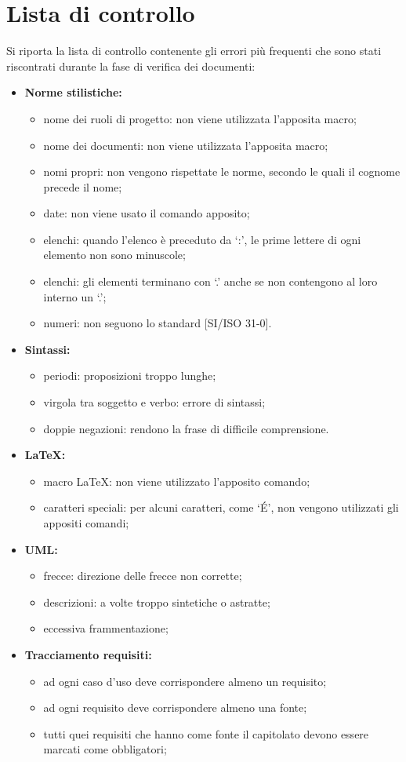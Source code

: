 \section{Lista di controllo}
Si riporta la lista di controllo contenente gli errori più frequenti che sono stati riscontrati durante la fase di verifica dei documenti:
\begin{itemize}
	\item \textbf{Norme stilistiche:}
	\begin{itemize}
		\item nome dei ruoli di progetto: non viene utilizzata l'apposita macro;
		\item nome dei documenti: non viene utilizzata l'apposita macro;
		\item nomi propri: non vengono rispettate le norme, secondo le quali il cognome precede il nome;
		\item date: non viene usato il comando apposito;
		\item elenchi: quando l'elenco è preceduto da ‘:’, le prime lettere di ogni elemento non sono minuscole;
		\item elenchi: gli elementi terminano con ‘.’ anche se non contengono al loro interno un ‘.’;
		\item numeri: non seguono lo standard [SI/ISO 31-0].
	\end{itemize}
	\item \textbf{Sintassi:}
	\begin{itemize}
		\item periodi: proposizioni troppo lunghe;
		\item virgola tra soggetto e verbo: errore di sintassi;
		\item doppie negazioni: rendono la frase di difficile comprensione.
	\end{itemize}
	\item \textbf{\LaTeX{}:}
	\begin{itemize}
		\item macro \LaTeX{}: non viene utilizzato l'apposito comando;
		\item caratteri speciali: per alcuni caratteri, come ‘\'{E}’, non vengono utilizzati gli appositi comandi;
	\end{itemize}
	\item \textbf{UML:}
	\begin{itemize}
		\item frecce: direzione delle frecce non corrette;
		\item descrizioni: a volte troppo sintetiche o astratte;
		\item eccessiva frammentazione;
	\end{itemize}
	\item \textbf{Tracciamento requisiti:}
	\begin{itemize}
		\item ad ogni caso d'uso deve corrispondere almeno un requisito;
		\item ad ogni requisito deve corrispondere almeno una fonte;
		\item tutti quei requisiti che hanno come fonte il capitolato devono essere marcati come obbligatori;
	\end{itemize}
\end{itemize}

